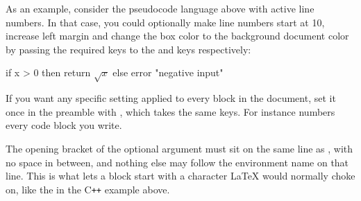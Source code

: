 \documentclass[../main.tex]{subfiles}
\begin{document}
As an example, consider the pseudocode language above with active line numbers. In that case, you could optionally make line numbers start at 10, increase left margin and change the box color to the background document color by passing the required keys to the  and  keys respectively:

\begin{pseudocode}[caption = {An example of custom code block with different options.}, linenos = true, options = {firstnumber=10, numbersep=2.5mm}, tcb = {colback=background, left=5mm}]
if x > 0 then
    return $\sqrt{x}$
else 
    error "negative input"
\end{pseudocode}

If you want any specific setting applied to every block in the document, set it once in the preamble with , which takes the same keys. For instance  numbers every code block you write.

\begin{note}
    The opening bracket of the optional argument must sit on the same line as , with no space in between, and nothing else may follow the environment name on that line. This is what lets a block start with a character LaTeX would normally choke on, like the  in the C\texttt{++} example above.
\end{note}
\end{document}

